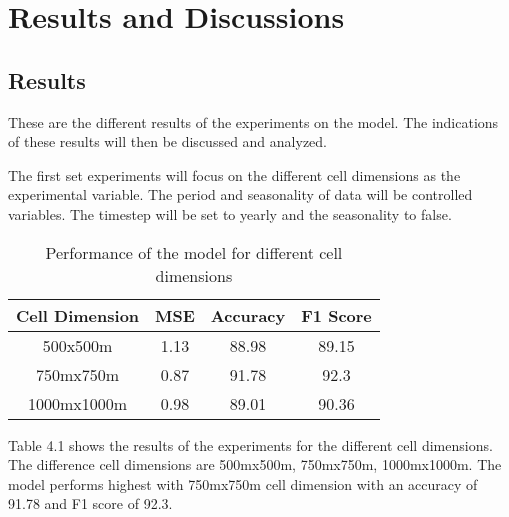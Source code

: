 
\chapter{Results and Discussions}  %

\section{Results}
    These are the different results of the experiments on the model. The indications of these results will then be discussed and analyzed.

    The first set experiments will focus on the different cell dimensions as the experimental variable. The period and seasonality of data will be controlled variables. The timestep will be set to yearly and the seasonality to false.

    \begin{table}[h]
      \centering
      \begin{tabular}{|c|c|c|c|}
            \hline
          \textbf{Cell Dimension}  &\textbf{MSE}  &\textbf{Accuracy} &\textbf{F1 Score}\\ 
          \hline
          500x500m &1.13 &88.98 &89.15 \\
          750mx750m &0.87 &91.78 &92.3 \\
          1000mx1000m  &0.98 &89.01 &90.36 \\
          \hline
        \end{tabular}
      \caption{Performance of the model for different cell dimensions}
    \end{table}
    Table 4.1 shows the results of the experiments for the different cell dimensions. The difference cell dimensions are 500mx500m, 750mx750m, 1000mx1000m. The model performs highest with 750mx750m cell dimension with an accuracy of 91.78 and F1 score of 92.3.


